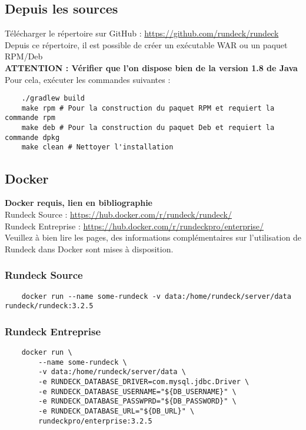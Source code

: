 \documentclass[12pt]{article}
\begin{document}
\subsection{Depuis les sources}
Télécharger le répertoire sur GitHub : \url{https://github.com/rundeck/rundeck} 
\\
Depuis ce répertoire, il est possible de créer un exécutable WAR ou un paquet RPM/Deb
\\
\textbf{ATTENTION : Vérifier que l'on dispose bien de la version 1.8 de Java}
\\
Pour cela, exécuter les commandes suivantes :
\begin{lstlisting}
    ./gradlew build
    make rpm # Pour la construction du paquet RPM et requiert la commande rpm
    make deb # Pour la construction du paquet Deb et requiert la commande dpkg
    make clean # Nettoyer l'installation
\end{lstlisting}

\subsection{Docker}
\textbf{Docker requis, lien en bibliographie}
\\
Rundeck Source : \url{https://hub.docker.com/r/rundeck/rundeck/}
\\
Rundeck Entreprise : \url{https://hub.docker.com/r/rundeckpro/enterprise/}
\\
Veuillez à bien lire les pages, des informations complémentaires sur l'utilisation de Rundeck dans Docker sont mises à disposition.

\subsubsection{Rundeck Source}
\begin{lstlisting}
    docker run --name some-rundeck -v data:/home/rundeck/server/data rundeck/rundeck:3.2.5
\end{lstlisting}

\subsubsection{Rundeck Entreprise}
\begin{lstlisting}
    docker run \
        --name some-rundeck \
        -v data:/home/rundeck/server/data \
        -e RUNDECK_DATABASE_DRIVER=com.mysql.jdbc.Driver \
        -e RUNDECK_DATABASE_USERNAME="${DB_USERNAME}" \
        -e RUNDECK_DATABASE_PASSWPRD="${DB_PASSWORD}" \
        -e RUNDECK_DATABASE_URL="${DB_URL}" \
        rundeckpro/enterprise:3.2.5
\end{lstlisting}
\end{document}
